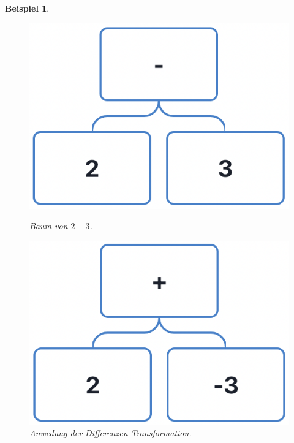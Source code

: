 \documentclass[11pt]{article}
\newtheorem{example}{Beispiel}
\begin{document}
\begin{example}
  \begin{figure}[h]
    \begin{minipage}{.5\textwidth}
      \centering
      \includegraphics[scale=0.4]{trees/difference/beispiel_1_1.png}
      \caption{Baum von $2-3$.}
    \end{minipage}
    \begin{minipage}{.5\textwidth}
      \centering
      \includegraphics[scale=0.4]{trees/difference/beispiel_1_2.png}
      \caption{Anwedung der Differenzen-Transformation.}
    \end{minipage}
  \end{figure}
  \begin{figure}[h]
    \centering

\end{figure}
\end{example}
\end{document}
